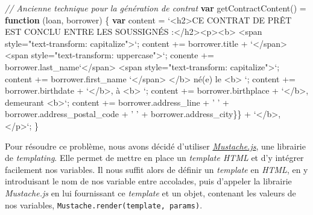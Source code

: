 \documentclass[12pt,a4paper]{article}
\newenvironment{Shaded}{}{}
\newcommand{\KeywordTok}[1]{\textcolor[rgb]{0.00,0.44,0.13}{\textbf{{#1}}}}
\newcommand{\StringTok}[1]{\textcolor[rgb]{0.25,0.44,0.63}{{#1}}}
\newcommand{\VerbatimStringTok}[1]{\textcolor[rgb]{0.25,0.44,0.63}{{#1}}}
\newcommand{\CommentTok}[1]{\textcolor[rgb]{0.38,0.63,0.69}{\textit{{#1}}}}
\newcommand{\VariableTok}[1]{\textcolor[rgb]{0.10,0.09,0.49}{{#1}}}
\newcommand{\OperatorTok}[1]{\textcolor[rgb]{0.40,0.40,0.40}{{#1}}}
\newcommand{\AttributeTok}[1]{\textcolor[rgb]{0.49,0.56,0.16}{{#1}}}
\newcommand{\NormalTok}[1]{{#1}}
\begin{document}
  \begin{Shaded}
  \begin{Highlighting}[]
  \CommentTok{// Ancienne technique pour la génération de contrat}
  \KeywordTok{var} \AttributeTok{getContractContent}\NormalTok{() }\OperatorTok{=} \KeywordTok{function} \NormalTok{(loan}\OperatorTok{,} \NormalTok{borrower) }\OperatorTok{\{}
    \KeywordTok{var} \NormalTok{content }\OperatorTok{=} \VerbatimStringTok{`<h2>CE CONTRAT DE PRÊT EST CONCLU}
  \VerbatimStringTok{    ENTRE LES SOUSSIGNÉS :</h2><p><b>}
  \VerbatimStringTok{    <span style="text-transform: capitalize">`}\OperatorTok{;}
    \NormalTok{content }\OperatorTok{+=} \VariableTok{borrower}\NormalTok{.}\AttributeTok{title} \OperatorTok{+} \VerbatimStringTok{`</span>}
  \VerbatimStringTok{   <span style="text-transform: uppercase">`}\OperatorTok{;}
    \NormalTok{conente }\OperatorTok{+=} \VariableTok{borrower}\NormalTok{.}\AttributeTok{last_name}\VerbatimStringTok{`</span>}
  \VerbatimStringTok{   <span style="text-transform: capitalize">`}\OperatorTok{;}
    \NormalTok{content }\OperatorTok{+=} \VariableTok{borrower}\NormalTok{.}\AttributeTok{first_name} \VerbatimStringTok{`</span>}
  \VerbatimStringTok{    </b> né(e) le <b> `}\OperatorTok{;}
    \NormalTok{content }\OperatorTok{+=} \VariableTok{borrower}\NormalTok{.}\AttributeTok{birthdate} \OperatorTok{+} \VerbatimStringTok{`</b>, à <b> `}\OperatorTok{;}
    \NormalTok{content }\OperatorTok{+=} \VariableTok{borrower}\NormalTok{.}\AttributeTok{birthplace} \OperatorTok{+} \VerbatimStringTok{`</b>, demeurant <b>`}\OperatorTok{;}
    \NormalTok{content }\OperatorTok{+=} \VariableTok{borrower}\NormalTok{.}\AttributeTok{address_line} \OperatorTok{+} \StringTok{' '}
      \OperatorTok{+} \VariableTok{borrower}\NormalTok{.}\AttributeTok{address_postal_code} \OperatorTok{+} \StringTok{' '}
      \OperatorTok{+}  \VariableTok{borrower}\NormalTok{.}\AttributeTok{address_city}\OperatorTok{\}}\NormalTok{\} }\OperatorTok{+} \VerbatimStringTok{`</b>, </p>`}\OperatorTok{;}
  \NormalTok{\}}
  \end{Highlighting}
  \end{Shaded}

  \bigskip

  Pour résoudre ce problème, nous avons décidé d'utiliser
  \href{https://github.com/janl/mustache.js}{\emph{Mustache.js}}, une
  librairie de \emph{templating}. Elle permet de mettre en place un
  \emph{template HTML} et d'y intégrer facilement nos variables. Il nous
  suffit alors de définir un \emph{template} en \emph{HTML}, en y
  introduisant le nom de nos variable entre accolades, puis d'appeler la
  librairie \emph{Mustache.js} en lui fournissant ce \emph{template} et un
  objet, contenant les valeurs de nos variables,
  \texttt{Mustache.render(template,\ params)}.
\end{document}
